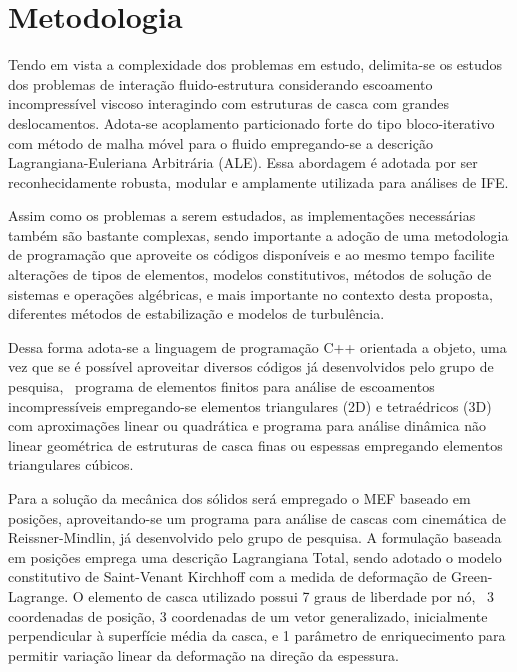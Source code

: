 \chapter{Metodologia} \label{MetodologiaCronograma}

Tendo em vista a complexidade dos problemas em estudo, delimita-se os estudos dos problemas de interação fluido-estrutura considerando escoamento incompressível viscoso interagindo com estruturas de casca com grandes deslocamentos. Adota-se acoplamento particionado forte do tipo bloco-iterativo com método de malha móvel para o fluido empregando-se a descrição Lagrangiana-Euleriana Arbitrária (ALE). Essa abordagem é adotada por ser reconhecidamente robusta, modular e amplamente utilizada para análises de IFE.

Assim como os problemas a serem estudados, as implementações necessárias também são bastante complexas, sendo importante a adoção de uma metodologia de programação que aproveite os códigos disponíveis e ao mesmo tempo facilite alterações de tipos de elementos, modelos constitutivos, métodos de solução de sistemas e operações algébricas, e mais importante no contexto desta proposta, diferentes métodos de estabilização e modelos de turbulência.

Dessa forma adota-se a linguagem de programação C++ orientada a objeto, uma vez que se é possível aproveitar diversos códigos já desenvolvidos pelo grupo de pesquisa, \ie\ programa de elementos finitos para análise de escoamentos incompressíveis empregando-se elementos triangulares (2D) e tetraédricos (3D) com aproximações linear ou quadrática e programa para análise dinâmica não linear geométrica de estruturas de casca finas ou espessas empregando elementos triangulares cúbicos.

Para a solução da mecânica dos sólidos será empregado o MEF baseado em posições, aproveitando-se um programa para análise de cascas com cinemática de Reissner-Mindlin, já desenvolvido pelo grupo de pesquisa. A formulação baseada em posições emprega uma descrição Lagrangiana Total, sendo adotado o modelo constitutivo de Saint-Venant Kirchhoff  com a medida de deformação de Green-Lagrange. O elemento de casca utilizado possui 7 graus de liberdade por nó, \ie\ 3 coordenadas de posição, 3 coordenadas de um vetor generalizado, inicialmente perpendicular à superfície média da casca, e 1 parâmetro de enriquecimento para permitir variação linear da deformação na direção da espessura.%

